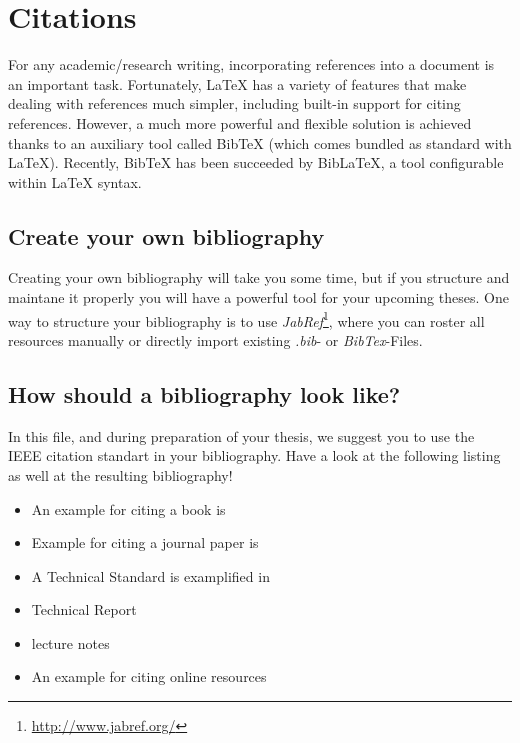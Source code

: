 \chapter{Citations}
For any academic/research writing, incorporating references into a document is an important task. Fortunately, LaTeX has a variety of features that make dealing with references much simpler, including built-in support for citing references. However, a much more powerful and flexible solution is achieved thanks to an auxiliary tool called BibTeX (which comes bundled as standard with LaTeX). Recently, BibTeX has been succeeded by BibLaTeX, a tool configurable within LaTeX syntax.

\section{Create your own bibliography}
Creating your own bibliography will take you some time, but if you structure and maintane it properly you will have a powerful tool for your upcoming theses. One way to structure your bibliography is to use \emph{JabRef}\footnote{\url{http://www.jabref.org/}}, where you can roster all resources manually or directly import existing \emph{.bib}- or \emph{BibTex}-Files.

\section{How should a bibliography look like?}
In this file, and during preparation of your thesis, we suggest you to use the IEEE citation standart in your bibliography. Have a look at the following listing as well at the resulting bibliography!

\begin{itemize}
	\item An example for citing a book is \cite{Mendel2007}\cite{MowlaeePejman2016}
	\item Example for citing a journal paper is \cite{MayerEtAl2017}
	\item A Technical Standard is examplified in \cite{Prechtl2006}
	\item Technical Report \cite{Mathworks2017}
	\item lecture notes \cite{Okorn2017}
	\item An example for citing online resources \cite{Goeschka}	
\end{itemize}